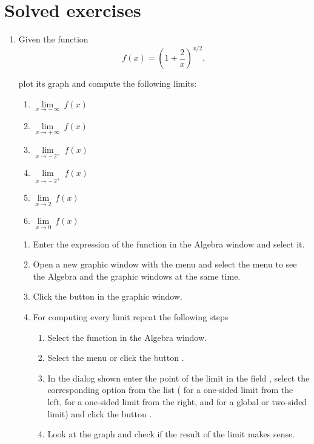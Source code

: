 \section{Solved exercises}
\begin{enumerate}[leftmargin=*]
\item Given the function
\[
f(x)=\left( 1+\frac 2x\right) ^{x/2},
\]

plot its graph and compute the following limits:

\begin{multicols}{2}
\begin{enumerate}
\item  $\lim\limits_{x\rightarrow -\,\infty }\ f(x)$
\item  $\lim\limits_{x\rightarrow +\,\infty }\ f(x)$
\item  $\lim\limits_{x\rightarrow -\,2^{-}}\ f(x)$
\item  $\lim\limits_{x\rightarrow -\,2^{+}}\ f(x)$
\item  $\lim\limits_{x\rightarrow 2}\ f(x)$
\item  $\lim\limits_{x\rightarrow 0}\ f(x)$
\end{enumerate}
\end{multicols}

\begin{indication}
\begin{enumerate}
\item Enter the expression of the function in the Algebra window and select it.
\item Open a new graphic window with the menu  and select the menu  to see the Algebra and the graphic windows at the same time.  
\item Click the button  in the graphic window.
\item For computing every limit repeat the following steps
\begin{enumerate}
\item Select the function in the Algebra window.
\item Select the menu  or click the button .
\item In the dialog shown enter the point of the limit in the field , select the corresponding option from the list  ( for a one-sided limit from the left,  for a one-sided limit from the right, and  for a global or two-sided limit) and click the button .
\item Look at the graph and check if the result of the limit makes sense. 
\end{enumerate}
\end{enumerate}
\end{indication}



\end{enumerate}
